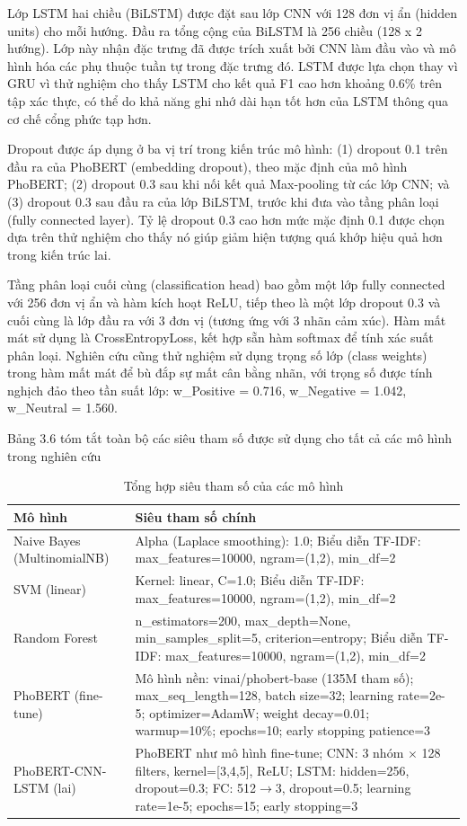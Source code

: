\documentclass[14pt, a4paper]{report}
\begin{document}
Lớp LSTM hai chiều (BiLSTM) được đặt sau lớp CNN với 128 đơn vị ẩn (hidden units) cho mỗi hướng. Đầu ra tổng cộng của BiLSTM là 256 chiều (128 x 2 hướng). Lớp này nhận đặc trưng đã được trích xuất bởi CNN làm đầu vào và mô hình hóa các phụ thuộc tuần tự trong đặc trưng đó. LSTM được lựa chọn thay vì GRU vì thử nghiệm cho thấy LSTM cho kết quả F1 cao hơn khoảng 0.6\% trên tập xác thực, có thể do khả năng ghi nhớ dài hạn tốt hơn của LSTM thông qua cơ chế cổng phức tạp hơn.


Dropout được áp dụng ở ba vị trí trong kiến trúc mô hình: (1) dropout 0.1 trên đầu ra của PhoBERT (embedding dropout), theo mặc định của mô hình PhoBERT; (2) dropout 0.3 sau khi nối kết quả Max-pooling từ các lớp CNN; và (3) dropout 0.3 sau đầu ra của lớp BiLSTM, trước khi đưa vào tầng phân loại (fully connected layer). Tỷ lệ dropout 0.3 cao hơn mức mặc định 0.1 được chọn dựa trên thử nghiệm cho thấy nó giúp giảm hiện tượng quá khớp hiệu quả hơn trong kiến trúc lai.


Tầng phân loại cuối cùng (classification head) bao gồm một lớp fully connected với 256 đơn vị ẩn và hàm kích hoạt ReLU, tiếp theo là một lớp dropout 0.3 và cuối cùng là lớp đầu ra với 3 đơn vị (tương ứng với 3 nhãn cảm xúc). Hàm mất mát sử dụng là CrossEntropyLoss, kết hợp sẵn hàm softmax để tính xác suất phân loại. Nghiên cứu cũng thử nghiệm sử dụng trọng số lớp (class weights) trong hàm mất mát để bù đắp sự mất cân bằng nhãn, với trọng số được tính nghịch đảo theo tần suất lớp: w\_Positive = 0.716, w\_Negative = 1.042, w\_Neutral = 1.560.


Bảng 3.6 tóm tắt toàn bộ các siêu tham số được sử dụng cho tất cả các mô hình trong nghiên cứu

\begin{table}[h]
\centering
\caption{Tổng hợp siêu tham số của các mô hình}
\small
\begin{tabular}{|p{3.1cm}|p{10.8cm}|}
\hline
\textbf{Mô hình} & \textbf{Siêu tham số chính} \\
\hline
Naive Bayes (MultinomialNB) & Alpha (Laplace smoothing): 1.0; Biểu diễn TF-IDF: max\_features=10000, ngram=(1,2), min\_df=2 \\
\hline
SVM (linear) & Kernel: linear, C=1.0; Biểu diễn TF-IDF: max\_features=10000, ngram=(1,2), min\_df=2 \\
\hline
Random Forest & n\_estimators=200, max\_depth=None, min\_samples\_split=5, criterion=entropy; Biểu diễn TF-IDF: max\_features=10000, ngram=(1,2), min\_df=2 \\
\hline
PhoBERT (fine-tune) & Mô hình nền: vinai/phobert-base (135M tham số); max\_seq\_length=128, batch size=32; learning rate=2e-5; optimizer=AdamW; weight decay=0.01; warmup=10\%; epochs=10; early stopping patience=3 \\
\hline
PhoBERT-CNN-LSTM (lai) & PhoBERT như mô hình fine-tune; CNN: 3 nhóm $\times$ 128 filters, kernel=[3,4,5], ReLU; LSTM: hidden=256, dropout=0.3; FC: 512$\rightarrow$3, dropout=0.5; learning rate=1e-5; epochs=15; early stopping=3 \\
\hline
\end{tabular}
\normalsize
\end{table}
\end{document}
